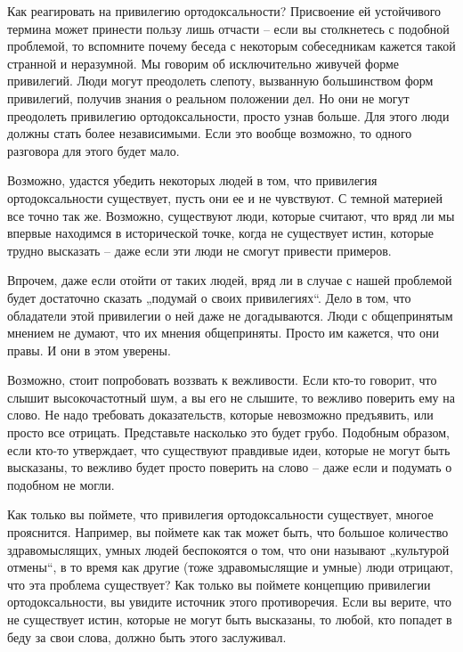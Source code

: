 \documentclass[ebook,12pt,oneside,openany]{memoir}
\begin{document}
Как реагировать на привилегию ортодоксальности? Присвоение ей
устойчивого термина может принести пользу лишь отчасти – если вы
столкнетесь с подобной проблемой, то вспомните почему беседа с
некоторым собеседникам кажется такой странной и неразумной. Мы говорим
об исключительно живучей форме привилегий. Люди могут преодолеть
слепоту, вызванную большинством форм привилегий, получив знания о
реальном положении дел. Но они не могут преодолеть привилегию
ортодоксальности, просто узнав больше. Для этого люди должны стать
более независимыми. Если это вообще возможно, то одного разговора для
этого будет мало. \newline

Возможно, удастся убедить некоторых людей в том, что привилегия
ортодоксальности существует, пусть они ее и не чувствуют. С темной
материей все точно так же. Возможно, существуют люди, которые считают,
что вряд ли мы впервые находимся в исторической точке, когда не
существует истин, которые трудно высказать – даже если эти люди не
смогут привести примеров. \newline

Впрочем, даже если отойти от таких людей, вряд ли в случае с нашей
проблемой будет достаточно сказать „подумай о своих привилегиях“. Дело
в том, что обладатели этой привилегии о ней даже не догадываются. Люди
с общепринятым мнением не думают, что их мнения общеприняты. Просто им
кажется, что они правы. И они в этом уверены. \newline

Возможно, стоит попробовать воззвать к вежливости. Если кто-то
говорит, что слышит высокочастотный шум, а вы его не слышите, то
вежливо поверить ему на слово. Не надо требовать доказательств,
которые невозможно предъявить, или просто все отрицать. Представьте
насколько это будет грубо. Подобным образом, если кто-то утверждает,
что существуют правдивые идеи, которые не могут быть высказаны, то
вежливо будет просто поверить на слово – даже если и подумать о
подобном не могли. \newline

Как только вы поймете, что привилегия ортодоксальности существует,
многое прояснится. Например, вы поймете как так может быть, что
большое количество здравомыслящих, умных людей беспокоятся о том, что
они называют „культурой отмены“, в то время как другие (тоже
здравомыслящие и умные) люди отрицают, что эта проблема существует?
Как только вы поймете концепцию привилегии ортодоксальности, вы
увидите источник этого противоречия. Если вы верите, что не существует
истин, которые не могут быть высказаны, то любой, кто попадет в беду
за свои слова, должно быть этого заслуживал.
\end{document}

